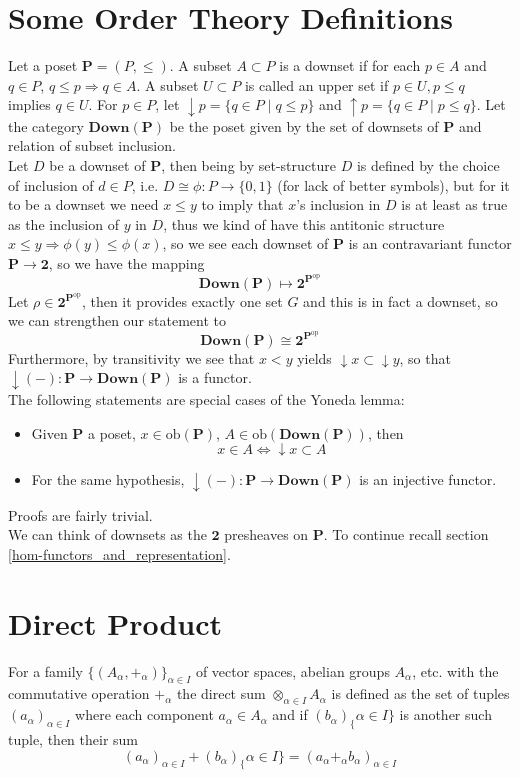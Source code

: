 \documentclass{article}
\newcommand{\cat}[1]{\mathbf{#1}}
\newcommand{\catt}[1]{\textbf{#1}}
\begin{document}
\section{Some Order Theory Definitions} \label{some_order_theory_definitions}
Let a poset $\cat{P} = (P, \leq)$. A subset $A \subset P$ is a downset if for each $p \in A$ and $q \in P$, $q \leq p \Rightarrow q \in A$. A subset $U \subset P$ is called an upper set if $p \in U, p \leq q$ implies $q \in U$. For $p \in P$, let $\downarrow p = \{q \in P \mid q \leq p\}$ and $\uparrow p = \{q \in P \mid p \leq q\}$. Let the category $\catt{Down}(\cat{P})$ be the poset given by the set of downsets of $\cat{P}$ and relation of subset inclusion. \\
Let $D$ be a downset of $\cat{P}$, then being by set-structure $D$ is defined by the choice of inclusion of $d \in P$, i.e. $D \cong \phi:P \to \{0,1\}$ (for lack of better symbols), but for it to be a downset we need $x \leq y$ to imply that $x$'s inclusion in $D$ is at least as true as the inclusion of $y$ in $D$, thus we kind of have this antitonic structure $x \leq y \Rightarrow \phi(y) \leq \phi(x)$, so we see each downset of $\cat{P}$ is an contravariant functor $\cat{P} \to \cat{2}$, so we have the mapping
$$\catt{Down}(\cat{P}) \mapsto \cat{2}^{\cat{P}^\text{op}}$$
Let $\rho \in \cat{2}^{\cat{P}^\text{op}}$, then it provides exactly one set $G$ and this is in fact a downset, so we can strengthen our statement to
$$\catt{Down}(\cat{P}) \cong \cat{2}^{\cat{P}^\text{op}}$$
Furthermore, by transitivity we see that $x < y$ yields $\downarrow x \subset \downarrow y$, so that $\downarrow (-): \cat{P} \to \catt{Down}(\cat{P})$ is a functor. \\
The following statements are special cases of the Yoneda lemma:
\begin{itemize}
	\item Given $\cat{P}$ a poset, $x \in \text{ob}(\cat{P})$, $A \in \text{ob}(\catt{Down}(\cat{P}))$, then
	$$x \in A \iff \downarrow x \subset A$$
	\item For the same hypothesis, $\downarrow (-): \cat{P} \to \catt{Down}(\cat{P})$ is an injective functor.
\end{itemize}
Proofs are fairly trivial.\\
We can think of downsets as the $\cat{2}$ presheaves on $\cat{P}$. To continue recall section \ref{hom-functors_and_representation}.

\section{Direct Product} \label{direct_product}
For a family $\{(A_\alpha, +_\alpha)\}_{\alpha \in I}$ of vector spaces, abelian groups $A_\alpha$, etc. with the commutative operation $+_\alpha$ the direct sum $\otimes_{\alpha \in I} A_\alpha$ is defined as the set of tuples $(a_\alpha)_{\alpha \in I}$ where each component $a_\alpha \in A_\alpha$ and if $(b_\alpha)_\{\alpha \in I\}$ is another such tuple, then their sum
$$ (a_\alpha)_{\alpha \in I} + (b_\alpha)_\{\alpha \in I\} = (a_\alpha +_\alpha b_\alpha)_{\alpha \in I}$$
\end{document}
